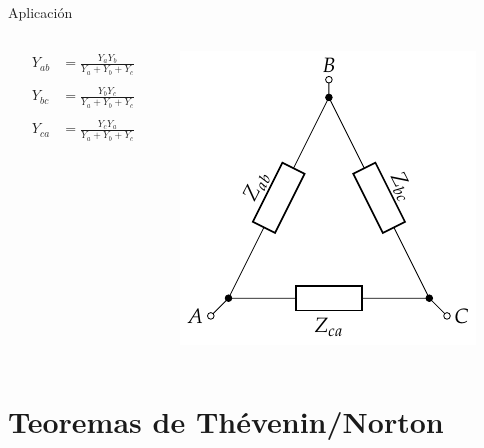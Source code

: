 \documentclass[aspectratio=169, usenames,svgnames,dvipsnames]{beamer}
\begin{document}
\begin{frame}[label={sec:orgbd3489d}]{Aplicación}
\begin{columns}
\begin{column}{0.3\columnwidth}
\begin{align*}
  Y_{ab} &= \frac{Y_a Y_b}{Y_a + Y_b + Y_c}\\
  \\
  Y_{bc} &= \frac{Y_b Y_c}{Y_a + Y_b + Y_c}\\
  \\
  Y_{ca} &= \frac{Y_c Y_a}{Y_a + Y_b + Y_c}\\
\end{align*}
\end{column}
\begin{column}{0.3\columnwidth}
\begin{center}
\includegraphics[height=0.5\textheight]{../figs/Impedancia_Triangulo.pdf}
\end{center}
\end{column}
\end{columns}
\end{frame}

\section{Teoremas de Thévenin/Norton}
\label{sec:orgd0ffc97}
\end{document}
